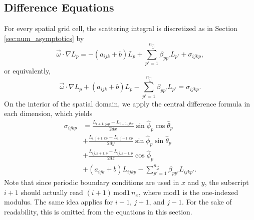 \subsection{Difference Equations}
\label{sec:difference_equations}

For every spatial grid cell, the scattering integral is discretized as in Section \ref{sec:num_asymptotics} by
\begin{equation*}
  \vec{\omega} \cdot \nabla L_p = -(a_{ijk}+b) L_p + \sum_{p'=1}^{n_{\vec{\omega}}} \beta_{pp'}L_{p'} + \sigma_{ijkp},
\end{equation*}
or equivalently,
\begin{equation*}
  \vec{\omega} \cdot \nabla L_p + (a_{ijk}+b)L_p - \sum_{p'=1}^{n_{\vec{\omega}}} \beta_{pp'} L_{p'} = \sigma_{ijkp}.
\end{equation*}
On the interior of the spatial domain, we apply the central difference formula in each dimension, which yields
\begin{equation*}
  \begin{aligned}
    \sigma_{ijkp} &= \frac{L_{i+1,jkp}-L_{i-1,jkp}}{2dx}\sin\hat{\phi}_p\cos\hat{\theta}_p \\
    &+ \frac{L_{i,j+1,kp}-L_{i,j-1,kp}}{2dy}\sin\hat{\phi}_p\sin\hat{\theta}_p \\
    &+ \frac{L_{ij,k+1,p}-L_{ij,k-1,p}}{2dz}\cos\hat{\phi}_p \\
    &+ (a_{ijk}+b)L_{ijkp}  - \sum_{p'=1}^{n_{\vec{\omega}}} \beta_{pp'} L_{ijkp'}.
  \end{aligned}
\end{equation*}
Note that since periodic boundary conditions are used in $x$ and $y$,
the subscript $i+1$ should actually read $(i+1) \, \mbox{mod1}\,  n_x$, where
mod1 is the one-indexed modulus.
The same idea applies for $i-1$, $j+1$, and $j-1$.
For the sake of readability, this is omitted from the equations in this section.

